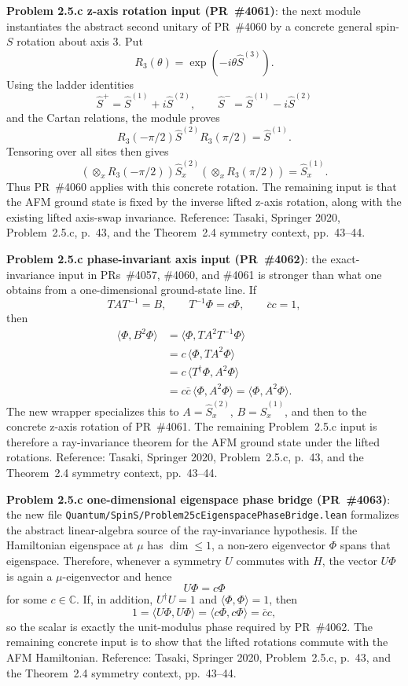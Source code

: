 \documentclass[a4paper,11pt]{article}
\begin{document}
\textbf{Problem 2.5.c z-axis rotation input (PR~\#4061)}:
the next module instantiates the abstract second unitary of PR~\#4060 by a
concrete general spin-\(S\) rotation about axis \(3\).  Put
\[
  R_3(\theta)=\exp(-i\theta\hat S^{(3)}).
\]
Using the ladder identities
\[
  \hat S^+=\hat S^{(1)}+i\hat S^{(2)},\qquad
  \hat S^-=\hat S^{(1)}-i\hat S^{(2)}
\]
and the Cartan relations, the module proves
\[
  R_3(-\pi/2)\hat S^{(2)}R_3(\pi/2)=\hat S^{(1)}.
\]
Tensoring over all sites then gives
\[
  (\otimes_x R_3(-\pi/2))\hat S_x^{(2)}
  (\otimes_x R_3(\pi/2))=\hat S_x^{(1)}.
\]
Thus PR~\#4060 applies with this concrete rotation.  The remaining input is
that the AFM ground state is fixed by the inverse lifted z-axis rotation, along
with the existing lifted axis-swap invariance.  Reference: Tasaki, Springer
2020, Problem~2.5.c, p.~43, and the Theorem~2.4 symmetry context, pp.~43--44.

\textbf{Problem 2.5.c phase-invariant axis input (PR~\#4062)}:
the exact-invariance input in PRs~\#4057, \#4060, and \#4061 is stronger than
what one obtains from a one-dimensional ground-state line.  If
\[
  T A T^{-1}=B,\qquad T^{-1}\Phi=c\Phi,\qquad \overline c c=1,
\]
then
\[
\begin{aligned}
  \langle\Phi,B^2\Phi\rangle
    &= \langle\Phi,T A^2 T^{-1}\Phi\rangle \\
    &= c\,\langle\Phi,T A^2\Phi\rangle \\
    &= c\,\langle T^\dagger\Phi,A^2\Phi\rangle \\
    &= c\overline c\,\langle\Phi,A^2\Phi\rangle
     = \langle\Phi,A^2\Phi\rangle .
\end{aligned}
\]
The new wrapper specializes this to \(A=\hat S_x^{(2)}\),
\(B=\hat S_x^{(1)}\), and then to the concrete z-axis rotation of PR~\#4061.
The remaining Problem~2.5.c input is therefore a ray-invariance theorem for the
AFM ground state under the lifted rotations.  Reference: Tasaki, Springer 2020,
Problem~2.5.c, p.~43, and the Theorem~2.4 symmetry context, pp.~43--44.

\textbf{Problem 2.5.c one-dimensional eigenspace phase bridge (PR~\#4063)}:
the new file \texttt{Quantum/SpinS/Problem25cEigenspacePhaseBridge.lean}
formalizes the abstract linear-algebra source of the ray-invariance hypothesis.
If the Hamiltonian eigenspace at \(\mu\) has \(\dim \le 1\), a non-zero
eigenvector \(\Phi\) spans that eigenspace.  Therefore, whenever a symmetry
\(U\) commutes with \(H\), the vector \(U\Phi\) is again a \(\mu\)-eigenvector
and hence
\[
  U\Phi=c\Phi
\]
for some \(c\in\mathbb C\).  If, in addition, \(U^\dagger U=1\) and
\(\langle\Phi,\Phi\rangle=1\), then
\[
  1=\langle U\Phi,U\Phi\rangle
   =\langle c\Phi,c\Phi\rangle
   =\overline c c,
\]
so the scalar is exactly the unit-modulus phase required by PR~\#4062.  The
remaining concrete input is to show that the lifted rotations commute with the
AFM Hamiltonian.  Reference: Tasaki, Springer 2020, Problem~2.5.c, p.~43, and
the Theorem~2.4 symmetry context, pp.~43--44.
\end{document}

